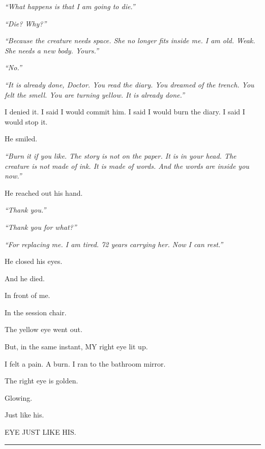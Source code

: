 \noindent \textit{\textquotedblleft{}What happens is that I am going to die.\textquotedblright{}}

\noindent \textit{\textquotedblleft{}Die? Why?\textquotedblright{}}

\noindent \textit{\textquotedblleft{}Because the creature needs space. She no longer fits inside me. I am old. Weak. She needs a new body. Yours.\textquotedblright{}}

\noindent \textit{\textquotedblleft{}No.\textquotedblright{}}

\noindent \textit{\textquotedblleft{}It is already done, Doctor. You read the diary. You dreamed of the trench. You felt the smell. You are turning yellow. It is already done.\textquotedblright{}}

\noindent I denied it. I said I would commit him. I said I would burn the diary. I said I would stop it.

\noindent He smiled.

\noindent \textit{\textquotedblleft{}Burn it if you like. The story is not on the paper. It is in your head. The creature is not made of ink. It is made of words. And the words are inside you now.\textquotedblright{}}

\noindent He reached out his hand.

\noindent \textit{\textquotedblleft{}Thank you.\textquotedblright{}}

\noindent \textit{\textquotedblleft{}Thank you for what?\textquotedblright{}}

\noindent \textit{\textquotedblleft{}For replacing me. I am tired. 72 years carrying her. Now I can rest.\textquotedblright{}}

\noindent He closed his eyes.

\noindent And he died.

\noindent In front of me.

\noindent In the session chair.

\noindent The yellow eye went out.

\noindent But, in the same instant, MY right eye lit up.

\noindent I felt a pain. A burn. I ran to the bathroom mirror.

\noindent The right eye is golden.

\noindent Glowing.

\noindent Just like his.

\noindent EYE JUST LIKE HIS.

\vspace{0.5em}\noindent\rule{\textwidth}{0.5pt}\vspace{0.5em}

